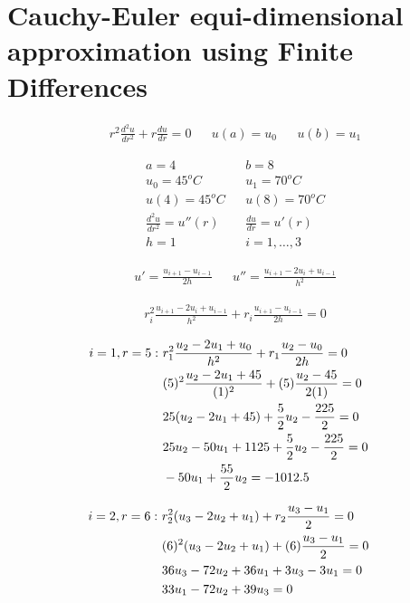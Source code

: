 \section{Cauchy-Euler equi-dimensional approximation using Finite Differences}

	\begin{align}
		&r^{2}\frac{d^{2}u}{dr^{2}}+r\frac{du}{dr} = 0&
		&u(a) = u_{0}&
		&u(b) = u_{1}&
	\end{align}

	\begin{align}
		&a = 4& &b = 8& \\
		&u_{0} = 45 ^{o}C& &u_{1} = 70 ^{o}C& \\
		&u(4) = 45 ^{o}C& &u(8) = 70 ^{o}C& \\
		&\frac{d^{2}u}{dr^{2}} = u''(r)& &\frac{du}{dr} = u'(r)& \\
		&h = 1& &i = 1,\dots,3&
	\end{align}

	\begin{align}
		&u' = \frac{u_{i+1} - u_{i-1}}{2h}&
		&u'' = \frac{u_{i+1} - 2u_{i} + u_{i-1}}{h^{2}}&
	\end{align}

	\begin{align}
		&r_{i}^{2}\frac{u_{i+1} - 2u_{i} + u_{i-1}}{h^{2}}+r_{i}\frac{u_{i+1} - u_{i-1}}{2h} = 0&
	\end{align}

	\begin{align}
		i=1,r=5: \ &
		r_{1}^{2}\frac{u_{2} - 2u_{1} + u_{0}}{h^{2}}+r_{1}\frac{u_{2} - u_{0}}{2h} = 0
		& \\ &
		(5)^{2}\frac{u_{2} - 2u_{1} + 45}{(1)^{2}}+(5)\frac{u_{2} - 45}{2(1)} = 0
		& \notag \\ &
		25(u_{2} - 2u_{1} + 45)+ \frac{5}{2}u_{2} - \frac{225}{2} = 0
		& \notag \\ &
		25u_{2} - 50u_{1} + 1125 + \frac{5}{2}u_{2} - \frac{225}{2} = 0
		& \notag \\ &
		- 50u_{1} + \frac{55}{2}u_{2} = -1012.5
	\end{align}

	\begin{align}
		i=2,r=6: \ &
		r_{2}^{2}(u_{3} - 2u_{2} + u_{1})+r_{2}\frac{u_{3} - u_{1}}{2} = 0
		& \\ &
		(6)^{2}(u_{3} - 2u_{2} + u_{1})+(6)\frac{u_{3} - u_{1}}{2} = 0
		& \notag \\ &
		36u_{3} - 72u_{2} + 36u_{1} + 3u_{3} - 3u_{1} = 0
		& \notag \\ &
		33u_{1} - 72u_{2} + 39u_{3} = 0
	\end{align}

